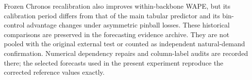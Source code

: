 Frozen Chronos recalibration also improves within-backbone WAPE, but its calibration period differs from that of the main tabular predictor and its bin-control advantage changes under asymmetric pinball losses. These historical comparisons are preserved in the forecasting evidence archive. They are not pooled with the original external test or counted as independent natural-demand confirmation. Numerical dependency repairs and column-label audits are recorded there; the selected forecasts used in the present experiment reproduce the corrected reference values exactly.
